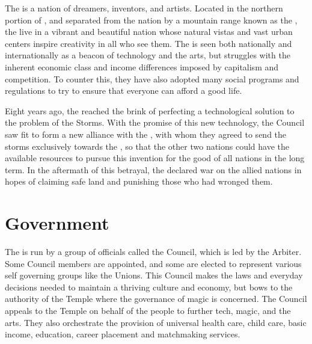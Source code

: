 \documentclass[blue]{GL2020}
\begin{document}
\name{\bTech{}}

The \pTech{} is a nation of dreamers, inventors, and artists.  Located in the northern portion of \pEarth{}, and separated from the \pFarm{} nation by a mountain range known as the \pSpine{}, the \pTechies{} live in a vibrant and beautiful nation whose natural vistas and vast urban centers inspire creativity in all who see them. The \pTech{} is seen both nationally and internationally as a beacon of technology and the arts, but struggles with the inherent economic class and income differences imposed by capitalism and competition. To counter this, they have also adopted many social programs and regulations to try to ensure that everyone can afford a good life.  

Eight years ago, the \pTechies{} reached the brink of perfecting a technological solution to the problem of the Storms. With the promise of this new technology, the Council saw fit to form a new alliance with the \pFarm{}, with whom they agreed to send the storms exclusively towards the \pShippies{}, so that the other two nations could have the available resources to pursue this invention for the good of all nations in the long term. In the aftermath of this betrayal, the \pShip{} declared war on the allied nations in hopes of claiming safe land and punishing those who had wronged them.

\section*{Government}
The \pTech{} is run by a group of officials called the Council, which is led by the Arbiter. Some Council members are appointed, and some are elected to represent various self governing groups like the Unions.  This Council makes the laws and everyday decisions needed to maintain a thriving culture and economy, but bows to the authority of the Temple where the governance of magic is concerned. The Council appeals to the Temple on behalf of the people to further tech, magic, and the arts. They also orchestrate the provision of universal health care, child care, basic income, education, career placement and matchmaking services.
\end{document}
